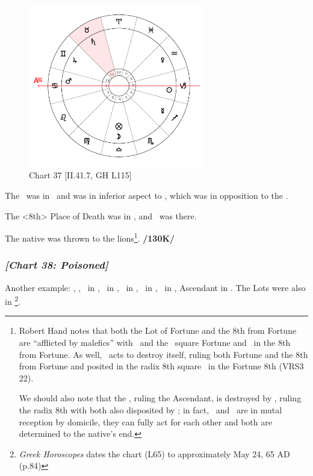 \clearpage
\begin{figure}
\centering
\vspace{-20pt}
\includegraphics[width=0.68\textwidth]{charts/2_41_7}
\caption{Chart 37 [II.41.7, GH L115]}
\label{fig:chart37}
\end{figure}

The \Moon\, was in \Libra\, and was in inferior aspect to \Mars, which was in opposition to the \Sun. 

The <8th> Place of Death was in \Taurus, and \Saturn\, was there. 

The native was thrown to the lions\footnote{Robert Hand notes that both the Lot of Fortune and the 8th from Fortune are ``afflicted by malefics'' with \Mars\, and the \Sun\, square Fortune and \Saturn\, in the 8th from Fortune. As well, \Venus\, acts to destroy itself, ruling both Fortune and the 8th from Fortune and posited in the radix 8th square \Saturn\, in the Fortune 8th (VRS3 22). 

We should also note that the \Moon, ruling the Ascendant, is destroyed by \Saturn, ruling the radix 8th with both also disposited by \Venus; in fact, \Venus\, and \Saturn\, are in mutal reception by domicile, they can fully act for each other and both are determined to the native's end.}. \textbf{/130K/} 
\newpage
\subsubsection{\textit{[Chart 38: Poisoned]}}
Another example: \Sun, \Moon, \Mercury\, in \Gemini, \Saturn\, in \Leo, \Jupiter\, in \Pisces, \Mars\, in \Cancer, \Venus\, in \Taurus, Ascendant in \Capricorn. The Lots were also in \Capricorn
\footnote{\textit{Greek Horoscopes} dates the chart (L65) to approximately May 24, 65 AD (p.84)}. 
 
